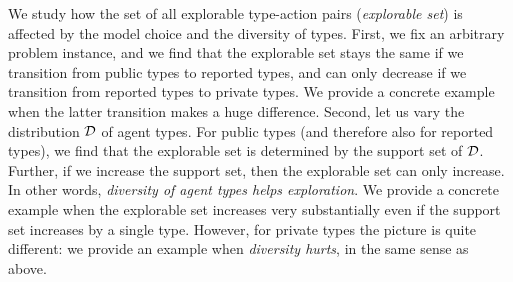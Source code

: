 We study how the set of all explorable type-action pairs (\emph{explorable set}) is affected by the model choice and the diversity of types. First, we fix an arbitrary problem instance, and we find that the explorable set stays the same if we transition from public types to reported types, and can only decrease if we transition from reported types to private types. We provide a concrete example when the latter transition makes a huge difference. Second, let us vary the distribution $\mathcal{D}$ of agent types. For public types (and therefore also for reported types), we find that the explorable set is determined by the support set of $\mathcal{D}$. Further, if we increase the support set, then the explorable set can only increase. In other words, \emph{diversity of agent types helps exploration}. We provide a concrete example when the explorable set increases very substantially even if the support set increases by a single type. However, for private types the picture is quite different: we provide an example when \emph{diversity hurts}, in the same sense as above. 